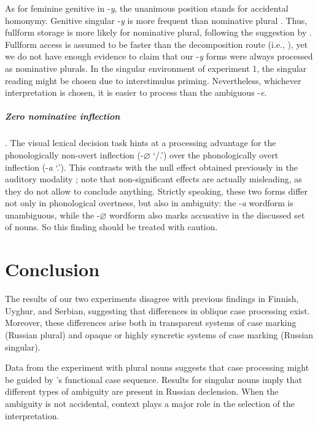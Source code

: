 \documentclass[output=paper, modfonts,newtxmath,hidelinks]{langscibook}
\begin{document}
As for feminine genitive in -\textit{y}, the unanimous position \citep{muller2004decomposing,wunderlich2004there,wiese2004categories} stands for accidental homonymy. Genitive singular -\textit{y} is more frequent than nominative plural \citep{samojlova2014frequencies}. Thus, fullform storage is more likely for nominative plural, following the suggestion by \citet{bertram2000role}. Fullform access is assumed to be faster than the decomposition route (i.e., \citealt{bertram2000role}), yet we do not have enough evidence to claim that our -\textit{y} forms were always processed as nominative plurals. In the singular environment of experiment 1, the singular reading might be chosen due to interstimulus priming. Nevertheless, whichever interpretation is chosen, it is easier to process than the ambiguous -\textit{e}.

\subparagraph*{{Zero nominative inflection}}. The visual lexical decision task hints at a processing advantage for the phonologically non-overt inflection (-\textit{$\varnothing$} `{\nomm/\accc.\masc}’) over the phonologically overt inflection (-\textit{a} `{\nomm.\fem}’). This contrasts with the null effect obtained previously in the auditory modality \citep{gor2017processing}; note that non-significant effects are actually misleading, as they do not allow to conclude anything. Strictly speaking, these two forms differ not only in phonological overtness, but also in ambiguity: the -\textit{a} wordform is unambiguous, while the -\textit{$\varnothing$} wordform also marks accusative in the discussed set of nouns. So this finding should be treated with caution.

\section{Conclusion}
The results of our two experiments disagree with previous findings in Finnish, Uyghur, and Serbian, suggesting that differences in oblique case processing exist. Moreover, these differences arise both in transparent systems of case marking (Russian plural) and opaque or highly syncretic systems of case marking (Russian singular). 

Data from the experiment with plural nouns suggests that case processing might be guided by \citeauthor{caha2008case}’s \citeyearpar{caha2008case} functional case sequence. Results for singular nouns imply that different types of ambiguity are present in Russian declension. When the ambiguity is not accidental, context plays a major role in the selection of the interpretation.
\end{document}
